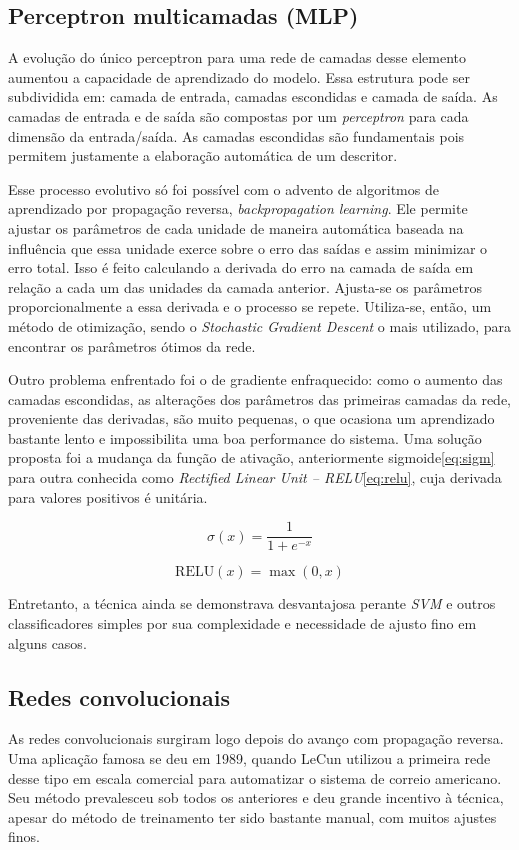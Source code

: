 \subsection{Perceptron multicamadas (MLP)}
A evolução do único perceptron para uma rede de camadas desse elemento aumentou a capacidade de aprendizado do modelo. Essa estrutura pode ser subdividida em: camada de entrada, camadas escondidas e camada de saída. As camadas de entrada e de saída são compostas por um \textit{perceptron} para cada dimensão da entrada/saída. As camadas escondidas são fundamentais pois permitem justamente a elaboração automática de um descritor.

Esse processo evolutivo só foi possível com o advento de algoritmos de aprendizado por propagação reversa, \textit{backpropagation learning}. Ele  permite ajustar os parâmetros de cada unidade de maneira automática baseada na influência que essa unidade exerce sobre o erro das saídas e assim minimizar o erro total. Isso é feito calculando a derivada do erro na camada de saída em relação a cada um das unidades da camada anterior. Ajusta-se os parâmetros proporcionalmente a essa derivada e o processo se repete. Utiliza-se, então, um método de otimização, sendo o \textit{Stochastic Gradient Descent} o mais utilizado, para encontrar os parâmetros ótimos da rede.

Outro problema enfrentado foi o de gradiente enfraquecido: como o aumento das camadas escondidas, as alterações dos parâmetros das primeiras camadas da rede, proveniente das derivadas, são muito pequenas, o que ocasiona um aprendizado bastante lento e impossibilita uma boa performance do sistema. Uma solução proposta foi a mudança da função de ativação, anteriormente sigmoide\ref{eq:sigm} para outra conhecida como \textit{Rectified Linear Unit -- RELU}\ref{eq:relu}, cuja derivada para valores positivos é unitária. 

\begin{equation}
	\label{eq:sigm}
	\sigma(x) = \frac{1}{1+e^{-x}}
\end{equation}

\begin{equation}
	\label{eq:relu}
	\text{RELU}(x) = \max(0,x)
\end{equation}

Entretanto, a técnica ainda se demonstrava desvantajosa perante \textit{SVM} e outros classificadores simples por sua complexidade e necessidade de ajusto fino em alguns casos. 

\subsection{Redes convolucionais}
As redes convolucionais surgiram logo depois do avanço com propagação reversa. Uma aplicação famosa se deu em 1989, quando LeCun utilizou a primeira rede desse tipo em escala comercial para automatizar o sistema de correio americano. Seu método prevalesceu sob todos os anteriores e deu grande incentivo à técnica, apesar do método de treinamento ter sido bastante manual, com muitos ajustes finos.

